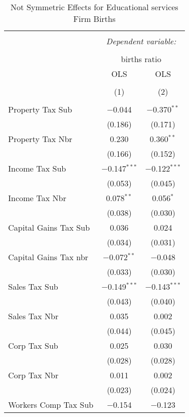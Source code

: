 
\begin{table}[!htbp] \centering 
  \caption{Not Symmetric Effects for  Educational services Firm Births} 
  \label{61noequality} 
\begin{tabular}{@{\extracolsep{5pt}}lcc} 
\\[-1.8ex]\hline 
\hline \\[-1.8ex] 
 & \multicolumn{2}{c}{\textit{Dependent variable:}} \\ 
\cline{2-3} 
\\[-1.8ex] & \multicolumn{2}{c}{births ratio} \\ 
 & OLS & OLS \\ 
\\[-1.8ex] & (1) & (2)\\ 
\hline \\[-1.8ex] 
 Property Tax Sub & $-$0.044 & $-$0.370$^{**}$ \\ 
  & (0.186) & (0.171) \\ 
  Property Tax Nbr & 0.230 & 0.360$^{**}$ \\ 
  & (0.166) & (0.152) \\ 
  Income Tax Sub & $-$0.147$^{***}$ & $-$0.122$^{***}$ \\ 
  & (0.053) & (0.045) \\ 
  Income Tax Nbr & 0.078$^{**}$ & 0.056$^{*}$ \\ 
  & (0.038) & (0.030) \\ 
  Capital Gains Tax Sub & 0.036 & 0.024 \\ 
  & (0.034) & (0.031) \\ 
  Capital Gains Tax nbr & $-$0.072$^{**}$ & $-$0.048 \\ 
  & (0.033) & (0.030) \\ 
  Sales Tax Sub & $-$0.149$^{***}$ & $-$0.143$^{***}$ \\ 
  & (0.043) & (0.040) \\ 
  Sales Tax Nbr & 0.035 & 0.002 \\ 
  & (0.044) & (0.045) \\ 
  Corp Tax Sub & 0.025 & 0.030 \\ 
  & (0.028) & (0.028) \\ 
  Corp Tax Nbr & 0.011 & 0.002 \\ 
  & (0.023) & (0.024) \\ 
  Workers Comp Tax Sub & $-$0.154 & $-$0.123 \\ 

\end{tabular}
\end{table}
